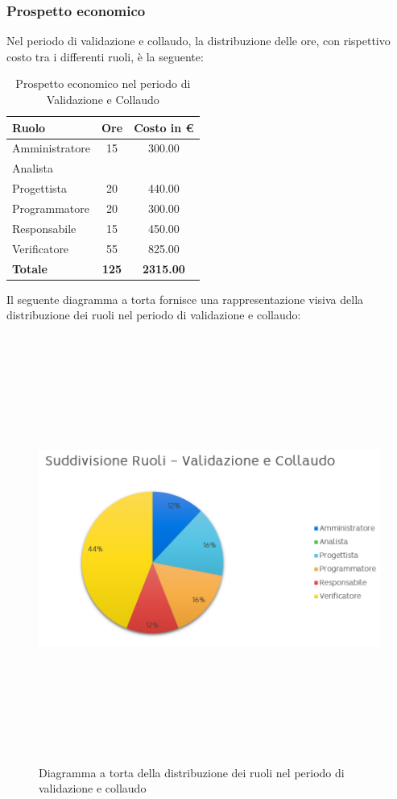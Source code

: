 \subsubsection{Prospetto economico}
Nel periodo di validazione e collaudo, la distribuzione delle ore, con rispettivo costo tra i differenti ruoli, è la seguente:

\begin{table}[htbp]
\centering
\begin{tabular}{| l c c |}
\hline
\textbf{Ruolo} & \textbf{Ore} & \textbf{Costo in €}\\
\hline
Amministratore & 15 & 300.00\\
Analista &  & \\
Progettista & 20 & 440.00 \\
Programmatore & 20 & 300.00\\
Responsabile & 15 & 450.00\\
Verificatore & 55 & 825.00\\
\hline
\textbf{Totale} & \textbf{125} & \textbf{2315.00}\\
\hline
\end{tabular}
\caption[Validazione e collaudo - Prospetto economico]{Prospetto economico nel periodo di Validazione e Collaudo}
\end{table}
\newpage
Il seguente diagramma a torta fornisce una rappresentazione visiva della distribuzione dei ruoli nel periodo di validazione e collaudo:

\begin{figure}[htbp]
\centering
\includegraphics[width=14cm,height=14cm,keepaspectratio]{./img/ProspettoOrario/SRValidazioneCollaudo.png}
\caption[Validazione e collaudo - Diagramma a torta suddivisione ruoli]{Diagramma a torta della distribuzione dei ruoli nel periodo di validazione e collaudo}
\end{figure}

